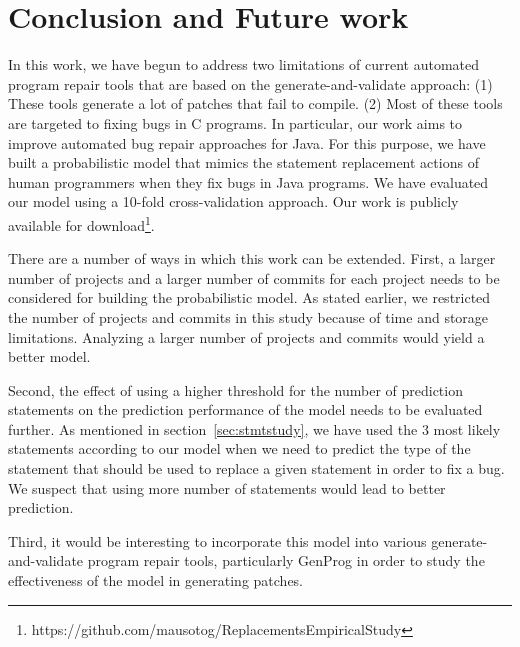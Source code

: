 
\section{Conclusion and Future work}

In this work, we have begun to address two limitations of current automated program repair tools that are based on the generate-and-validate approach: (1) These tools generate a lot of patches that fail to compile. (2) Most of these tools are targeted to fixing bugs in C programs. In particular, our work aims to improve automated bug repair approaches for Java. For this purpose, we have built a probabilistic model that mimics the statement replacement actions of human programmers when they fix bugs in Java programs. We have evaluated our model using a 10-fold cross-validation approach. Our work is publicly available for download\footnote{https://github.com/mausotog/ReplacementsEmpiricalStudy}.

There are a number of ways in which this work can be extended. First, a larger number of projects and a larger number of commits for each project needs to be considered for building the probabilistic model. As stated earlier, we restricted the number of projects and commits in this study because of time and storage limitations. Analyzing a larger number of projects and commits would yield a better model.

Second, the effect of using a higher threshold for the number of prediction statements on the prediction performance of the model needs to be evaluated further. As mentioned in section~\ref{sec:stmtstudy}, we have used the 3 most likely statements according to our model when we need to predict the type of the statement that should be used to replace a given statement in order to fix a  bug. We suspect that using more number of statements would lead to better prediction.

Third, it would be interesting to incorporate this model into various generate-and-validate program repair tools, particularly GenProg in order to study the effectiveness of the model in generating patches.
